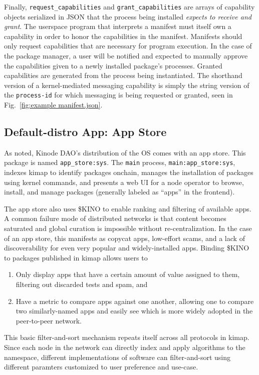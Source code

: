 \documentclass[runningheads]{llncs}
\begin{document}
Finally, \verb|request_capabilities| and \verb|grant_capabilities| are arrays of capability objects serialized in JSON that the process being installed \textit{expects to receive and grant}.
The userspace program that interprets a manifest must itself own a capability in order to honor the capabilities in the manifest.
Manifests should only request capabilities that are necessary for program execution.
In the case of the package manager, a user will be notified and expected to manually approve the capabilities given to a newly installed package's processes.
Granted capabilities are generated from the process being instantiated.
The shorthand version of a kernel-mediated messaging capability is simply the string version of the \verb|process-id| for which messaging is being requested or granted, seen in Fig.~\ref{fig:example manifest.json}.

\subsection{Default-distro App: App Store}
\label{sec:appstore}

As noted, Kinode DAO's distribution of the OS comes with an app store.
This package is named \verb|app_store:sys|.
The \verb|main| process, \verb|main:app_store:sys|, indexes kimap to identify packages onchain, manages the installation of packages using kernel commands, and presents a web UI for a node operator to browse, install, and manage packages (generally labeled as ``apps'' in the frontend).

The app store also uses \$KINO to enable ranking and filtering of available apps.
A common failure mode of distributed networks is that content becomes saturated and global curation is impossible without re-centralization.
In the case of an app store, this manifests as copycat apps, low-effort scams, and a lack of discoverability for even very popular and widely-installed apps.
Binding \$KINO to packages published in kimap allows users to
\begin{enumerate}
	\item Only display apps that have a certain amount of value assigned to them, filtering out discarded tests and spam, and
	\item Have a metric to compare apps against one another, allowing one to compare two similarly-named apps and easily see which is more widely adopted in the peer-to-peer network.
\end{enumerate}
This basic filter-and-sort mechanism repeats itself across all protocols in kimap.
Since each node in the network can directly index and apply algorithms to the namespace, different implementations of software can filter-and-sort using different paramters customized to user preference and use-case.
\end{document}
